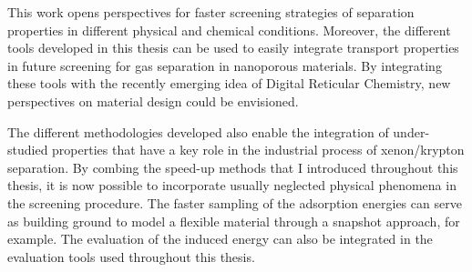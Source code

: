 This work opens perspectives for faster screening strategies of separation properties in different physical and chemical conditions. Moreover, the different tools developed in this thesis can be used to easily integrate transport properties in future screening for gas separation in nanoporous materials. By integrating these tools with the recently emerging idea of Digital Reticular Chemistry,\autocite{Lyu_2020} new perspectives on material design could be envisioned. 

The different methodologies developed also enable the integration of under-studied properties that have a key role in the industrial process of xenon/krypton separation. By combing the speed-up methods that I introduced throughout this thesis, it is now possible to incorporate usually neglected physical phenomena in the screening procedure. The faster sampling of the adsorption energies can serve as building ground to model a flexible material through a snapshot approach, for example\autocite{Witman_2017}. The evaluation of the induced energy\autocite{Lachet_1998} can also be integrated in the evaluation tools used throughout this thesis. 



\vfill
\begin{center}
\end{center}
\vfill\vfill
